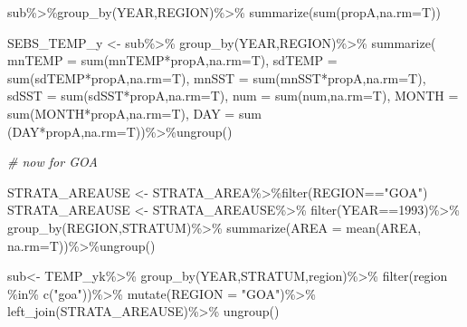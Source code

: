 \documentclass[
]{article}
\newenvironment{Shaded}{\begin{snugshade}}{\end{snugshade}}
\newcommand{\AttributeTok}[1]{\textcolor[rgb]{0.77,0.63,0.00}{#1}}
\newcommand{\CommentTok}[1]{\textcolor[rgb]{0.56,0.35,0.01}{\textit{#1}}}
\newcommand{\DecValTok}[1]{\textcolor[rgb]{0.00,0.00,0.81}{#1}}
\newcommand{\FunctionTok}[1]{\textcolor[rgb]{0.00,0.00,0.00}{#1}}
\newcommand{\NormalTok}[1]{#1}
\newcommand{\OtherTok}[1]{\textcolor[rgb]{0.56,0.35,0.01}{#1}}
\newcommand{\SpecialCharTok}[1]{\textcolor[rgb]{0.00,0.00,0.00}{#1}}
\newcommand{\StringTok}[1]{\textcolor[rgb]{0.31,0.60,0.02}{#1}}
\begin{document}
\begin{Shaded}
\begin{Highlighting}[]
  
\NormalTok{  sub}\SpecialCharTok{\%\textgreater{}\%}\FunctionTok{group\_by}\NormalTok{(YEAR,REGION)}\SpecialCharTok{\%\textgreater{}\%}
        \FunctionTok{summarize}\NormalTok{(}\FunctionTok{sum}\NormalTok{(propA,}\AttributeTok{na.rm=}\NormalTok{T))}
  
  
\NormalTok{  SEBS\_TEMP\_y }\OtherTok{\textless{}{-}}\NormalTok{ sub}\SpecialCharTok{\%\textgreater{}\%}
    \FunctionTok{group\_by}\NormalTok{(YEAR,REGION)}\SpecialCharTok{\%\textgreater{}\%}
    \FunctionTok{summarize}\NormalTok{(}
        \AttributeTok{mnTEMP =} \FunctionTok{sum}\NormalTok{(mnTEMP}\SpecialCharTok{*}\NormalTok{propA,}\AttributeTok{na.rm=}\NormalTok{T),}
        \AttributeTok{sdTEMP =} \FunctionTok{sum}\NormalTok{(sdTEMP}\SpecialCharTok{*}\NormalTok{propA,}\AttributeTok{na.rm=}\NormalTok{T),}
        \AttributeTok{mnSST  =} \FunctionTok{sum}\NormalTok{(mnSST}\SpecialCharTok{*}\NormalTok{propA,}\AttributeTok{na.rm=}\NormalTok{T),}
        \AttributeTok{sdSST  =} \FunctionTok{sum}\NormalTok{(sdSST}\SpecialCharTok{*}\NormalTok{propA,}\AttributeTok{na.rm=}\NormalTok{T),}
        \AttributeTok{num    =} \FunctionTok{sum}\NormalTok{(num,}\AttributeTok{na.rm=}\NormalTok{T),}
        \AttributeTok{MONTH  =} \FunctionTok{sum}\NormalTok{(MONTH}\SpecialCharTok{*}\NormalTok{propA,}\AttributeTok{na.rm=}\NormalTok{T),}
        \AttributeTok{DAY    =} \FunctionTok{sum}\NormalTok{ (DAY}\SpecialCharTok{*}\NormalTok{propA,}\AttributeTok{na.rm=}\NormalTok{T))}\SpecialCharTok{\%\textgreater{}\%}\FunctionTok{ungroup}\NormalTok{()}
  
  
  \CommentTok{\# now for GOA}
  
\NormalTok{  STRATA\_AREAUSE }\OtherTok{\textless{}{-}}\NormalTok{ STRATA\_AREA}\SpecialCharTok{\%\textgreater{}\%}\FunctionTok{filter}\NormalTok{(REGION}\SpecialCharTok{==}\StringTok{"GOA"}\NormalTok{)}
\NormalTok{       STRATA\_AREAUSE }\OtherTok{\textless{}{-}}\NormalTok{ STRATA\_AREAUSE}\SpecialCharTok{\%\textgreater{}\%}
          \FunctionTok{filter}\NormalTok{(YEAR}\SpecialCharTok{==}\DecValTok{1993}\NormalTok{)}\SpecialCharTok{\%\textgreater{}\%}
          \FunctionTok{group\_by}\NormalTok{(REGION,STRATUM)}\SpecialCharTok{\%\textgreater{}\%}
          \FunctionTok{summarize}\NormalTok{(}\AttributeTok{AREA =} \FunctionTok{mean}\NormalTok{(AREA, }\AttributeTok{na.rm=}\NormalTok{T))}\SpecialCharTok{\%\textgreater{}\%}\FunctionTok{ungroup}\NormalTok{()}
        
\NormalTok{  sub}\OtherTok{\textless{}{-}}\NormalTok{ TEMP\_yk}\SpecialCharTok{\%\textgreater{}\%}
    \FunctionTok{group\_by}\NormalTok{(YEAR,STRATUM,region)}\SpecialCharTok{\%\textgreater{}\%}
    \FunctionTok{filter}\NormalTok{(region }\SpecialCharTok{\%in\%} \FunctionTok{c}\NormalTok{(}\StringTok{"goa"}\NormalTok{))}\SpecialCharTok{\%\textgreater{}\%}
    \FunctionTok{mutate}\NormalTok{(}\AttributeTok{REGION =} \StringTok{"GOA"}\NormalTok{)}\SpecialCharTok{\%\textgreater{}\%}
    \FunctionTok{left\_join}\NormalTok{(STRATA\_AREAUSE)}\SpecialCharTok{\%\textgreater{}\%}
    \FunctionTok{ungroup}\NormalTok{()}
  

\end{Highlighting}
\end{Shaded}
\end{document}
